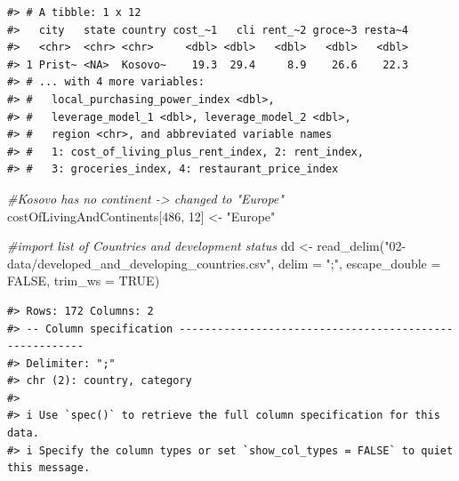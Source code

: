 \documentclass[
  11pt,
  a4paper,
  twoside]{scrbook}
\newenvironment{Shaded}{\begin{snugshade}}{\end{snugshade}}
\newcommand{\AttributeTok}[1]{\textcolor[rgb]{0.77,0.63,0.00}{#1}}
\newcommand{\CommentTok}[1]{\textcolor[rgb]{0.56,0.35,0.01}{\textit{#1}}}
\newcommand{\ConstantTok}[1]{\textcolor[rgb]{0.00,0.00,0.00}{#1}}
\newcommand{\DecValTok}[1]{\textcolor[rgb]{0.00,0.00,0.81}{#1}}
\newcommand{\FunctionTok}[1]{\textcolor[rgb]{0.00,0.00,0.00}{#1}}
\newcommand{\NormalTok}[1]{#1}
\newcommand{\OtherTok}[1]{\textcolor[rgb]{0.56,0.35,0.01}{#1}}
\newcommand{\StringTok}[1]{\textcolor[rgb]{0.31,0.60,0.02}{#1}}
\begin{document}
\linespread{1}

\begin{verbatim}
#> # A tibble: 1 x 12
#>   city   state country cost_~1   cli rent_~2 groce~3 resta~4
#>   <chr>  <chr> <chr>     <dbl> <dbl>   <dbl>   <dbl>   <dbl>
#> 1 Prist~ <NA>  Kosovo~    19.3  29.4     8.9    26.6    22.3
#> # ... with 4 more variables:
#> #   local_purchasing_power_index <dbl>,
#> #   leverage_model_1 <dbl>, leverage_model_2 <dbl>,
#> #   region <chr>, and abbreviated variable names
#> #   1: cost_of_living_plus_rent_index, 2: rent_index,
#> #   3: groceries_index, 4: restaurant_price_index
\end{verbatim}

\linespread{1}

\begin{Shaded}
\begin{Highlighting}[]
\CommentTok{\#Kosovo has no continent {-}\textgreater{} changed to "Europe"}
\NormalTok{costOfLivingAndContinents[}\DecValTok{486}\NormalTok{, }\DecValTok{12}\NormalTok{] }\OtherTok{\textless{}{-}} \StringTok{"Europe"}

\CommentTok{\#import list of Countries and development status}
\NormalTok{dd }\OtherTok{\textless{}{-}} \FunctionTok{read\_delim}\NormalTok{(}\StringTok{"02{-}data/developed\_and\_developing\_countries.csv"}\NormalTok{,}
                 \AttributeTok{delim =} \StringTok{";"}\NormalTok{, }\AttributeTok{escape\_double =} \ConstantTok{FALSE}\NormalTok{,}
                 \AttributeTok{trim\_ws =} \ConstantTok{TRUE}\NormalTok{)}
\end{Highlighting}
\end{Shaded}

\linespread{1}

\begin{verbatim}
#> Rows: 172 Columns: 2
#> -- Column specification -------------------------------------------------------
#> Delimiter: ";"
#> chr (2): country, category
#> 
#> i Use `spec()` to retrieve the full column specification for this data.
#> i Specify the column types or set `show_col_types = FALSE` to quiet this message.
\end{verbatim}

\linespread{1}
\end{document}
